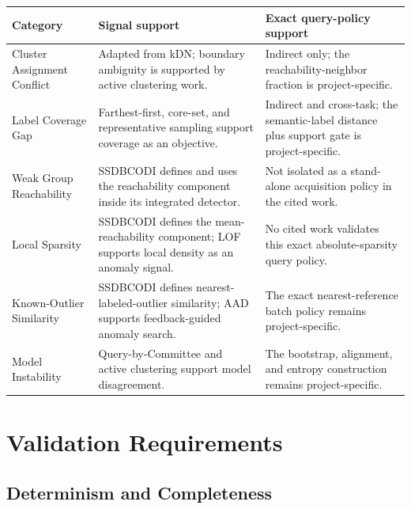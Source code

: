 \documentclass[11pt]{article}
\begin{document}
\begin{table}[h]
\centering
\small
\begin{tabularx}{\textwidth}{p{} p{} X}
\toprule
Category & Signal support & Exact query-policy support \\
\midrule
Cluster Assignment Conflict & Adapted from kDN; boundary ambiguity is supported
by active clustering work. & Indirect only; the reachability-neighbor fraction
is project-specific. \\

Label Coverage Gap & Farthest-first, core-set, and representative sampling
support coverage as an objective. & Indirect and cross-task; the semantic-label
distance plus support gate is project-specific. \\

Weak Group Reachability & SSDBCODI defines and uses the reachability component
inside its integrated detector. & Not isolated as a stand-alone acquisition
policy in the cited work. \\

Local Sparsity & SSDBCODI defines the mean-reachability component; LOF supports
local density as an anomaly signal. & No cited work validates this exact
absolute-sparsity query policy. \\

Known-Outlier Similarity & SSDBCODI defines nearest-labeled-outlier similarity;
AAD supports feedback-guided anomaly search. & The exact nearest-reference
batch policy remains project-specific. \\

Model Instability & Query-by-Committee and active clustering support model
disagreement. & The bootstrap, alignment, and entropy construction remains
project-specific. \\
\bottomrule
\end{tabularx}
\end{table}

\section{Validation Requirements}

\subsection{Determinism and Completeness}
\end{document}
